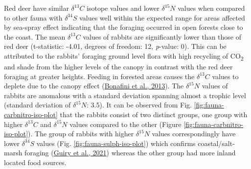 \documentclass[preprint, 3p, authoryear]{elsarticle} %
\begin{document}
Red deer have similar \(\delta ^{13}C\) isotope values and lower \(\delta ^{15}N\) values when compared to other fauna with \(\delta ^{34}S\) values well within the expected range for areas affected by sea-spray effect indicating that the foraging occurred in open forests close to the coast. The mean \(\delta ^{13}C\) values of rabbits are significantly lower than those of red deer (t-statistic: -4.01, degrees of freedom: 12, \emph{p}-value: 0). This can be attributed to the rabbits' foraging ground level flora with high recycling of CO\textsubscript{2} and shade from the higher levels of the canopy in contrast with the red deer foraging at greater heights. Feeding in forested areas causes the \(\delta ^{13}C\) values to deplete due to the canopy effect (\protect\hyperlink{ref-bonafini_etal13}{Bonafini et al., 2013}). The \(\delta ^{15}N\) values of rabbits are anomalous with a standard deviation spanning almost a trophic level (standard deviation of \(\delta ^{15}N\): 3.5\text{\textperthousand}). It can be observed from Fig. \ref{fig:fauna-carbnitro-iso-plot} that the rabbits consist of two distinct groups, one group with higher \(\delta ^{13}C\) and \(\delta ^{15}N\) values compared to the other (Figure \ref{fig:fauna-carbnitro-iso-plot}). The group of rabbits with higher \(\delta ^{15}N\) values correspondingly have lower \(\delta ^{34}S\) values (Fig. \ref{fig:fauna-sulph-iso-plot}) which confirms coastal/salt-marsh foraging (\protect\hyperlink{ref-guiry_etal21a}{Guiry et al., 2021}) whereas the other group had more inland located food sources.
\end{document}
